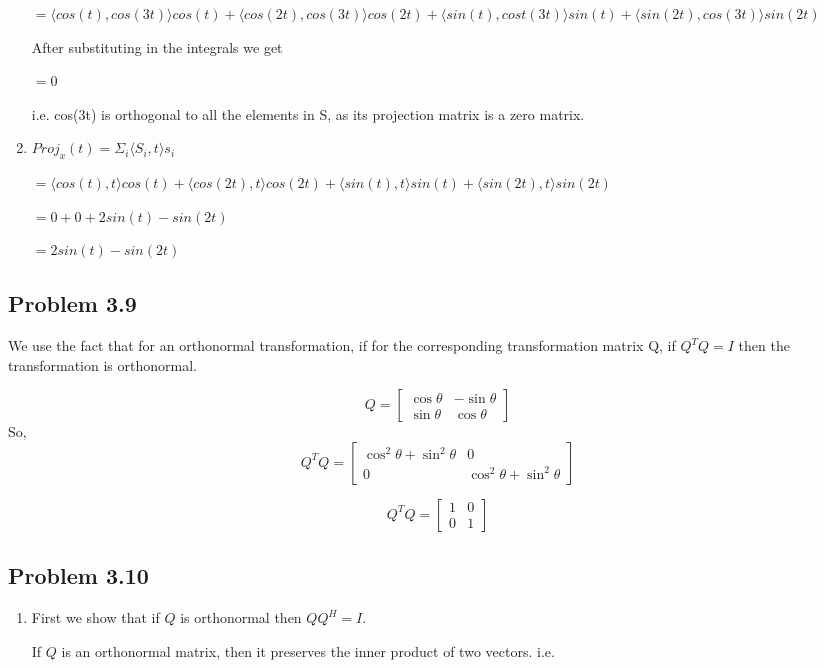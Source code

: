 \documentclass[letterpaper,12pt]{article}
\theoremstyle{definition}
\begin{document}
\begin{spacing}{1.3}{}
\begin{enumerate}
	$= \langle cos(t), cos(3t) \rangle cos(t) + \langle cos(2t), cos(3t) \rangle cos(2t) + \langle sin(t), cost(3t) \rangle sin(t) + \langle sin(2t), cos(3t) \rangle sin(2t)$
	
	After substituting in the integrals we get
	
	$=0$
	
	i.e. cos(3t) is orthogonal to all the elements in S, as its projection matrix is a zero matrix.
	\item
		$Proj_{x}(t) = \Sigma_{i}\langle S_i , t \rangle s_i$
	
	$= \langle cos(t), t \rangle cos(t) + \langle cos(2t), t \rangle cos(2t) + \langle sin(t), t \rangle sin(t) + \langle sin(2t), t \rangle sin(2t)$
	
	$= 0 + 0 + 2sin(t) - sin(2t)$
	
	$=2sin(t) - sin(2t)$
	
\end{enumerate}
	
\subsection*{Problem 3.9}
	
	We use the fact that for an orthonormal transformation, if for the corresponding transformation matrix Q, if  $Q^TQ = I$ then the transformation is orthonormal.  
	
	\[Q=
	\begin{bmatrix}
	\cos \theta & -\sin \theta \\
	\sin \theta & \cos \theta
	\end{bmatrix}
	\]
	So,
	\[Q^{T}Q=
	\begin{bmatrix}
	\cos^{2} \theta + \sin^{2} \theta & 0 \\
	0 & \cos^{2} \theta + \sin^{2} \theta
	\end{bmatrix}
	\]
	
	\[Q^{T}Q=
	\begin{bmatrix}
	1 & 0 \\
	0 & 1
	\end{bmatrix}
	\]
	
\subsection*{Problem 3.10}
\begin{enumerate}
  \item 
  First we show that if $Q$ is orthonormal then $QQ^H = I$.
	
	If $Q$ is an orthonormal matrix, then it preserves the inner product of two vectors. i.e.
	

\end{enumerate}
\end{spacing}
\end{document}

